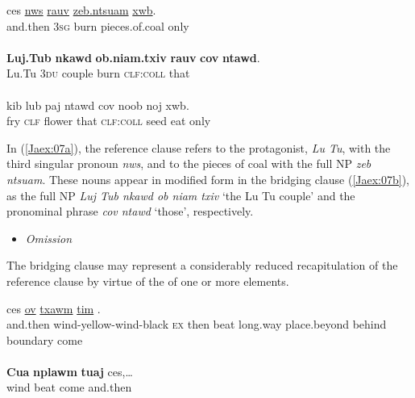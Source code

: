 \documentclass[output=paper]{LSP/langsci}
\begin{document}
\begin{exe}
\ex \label{Jaex:07ac}
\begin{xlist}
\ex \label{Jaex:07a}
\gll ces  \underline{nws} \underline{rauv} \underline{zeb.ntsuam} \underline{xwb}.\\
and.then 3\textsc{sg} burn pieces.of.coal only\\
\glt {}\\
\ex \label{Jaex:07b}
\gll \textbf{Luj.Tub} \textbf{nkawd} \textbf{ob.niam.txiv} \textbf{rauv} \textbf{cov}  \textbf{ntawd}.\\
Lu.Tu 3\textsc{du} couple burn \textsc{clf:coll} that\\
\glt {}\\
\ex \label{Jaex:07c}
\gll kib lub paj ntawd cov noob noj xwb.\\     	      
     fry \textsc{clf} flower that  \textsc{clf:coll} seed eat only\\
\glt {} \citep[][3]{johnson92}
\end{xlist}
\end{exe}

\noindent
In (\ref{Jaex:07a}), the reference clause refers to the protagonist, \textit{Lu Tu}, with the third singular pronoun \textit{nws}, and to the pieces of coal with the full NP \textit{zeb ntsuam}. These nouns appear in modified form in the bridging clause (\ref{Jaex:07b}), as the full NP \textit{Luj Tub nkawd ob niam txiv } `the Lu Tu couple' and the pronominal phrase \textit{cov ntawd } `those', respectively. 

%
\begin{itemize}
\item \textit{Omission}
\end{itemize}

The bridging clause may represent a considerably reduced recapitulation of the reference clause by virtue of the  of one or more elements.

%
\begin{exe}
\ex \label{Jaex:08ab}
\begin{xlist}
\ex \label{Jaex:08a}
\gll ces  \underline{} \underline{ov} \underline{txawm} \underline{} \underline{} \underline{tim} \underline{} \underline{} \underline{}.\\
and.then wind-yellow-wind-black \textsc{ex} then beat long.way place.beyond behind boundary come \\
\glt {}\\
\ex \label{Jaex:08b}
\gll \textbf{Cua}  \textbf{nplawm}  \textbf{tuaj} ces,…\\     	      
     wind  beat   come  and.then\\
\glt {} \citep[][4]{johnson92}
\end{xlist}
\end{exe}
\end{document}
